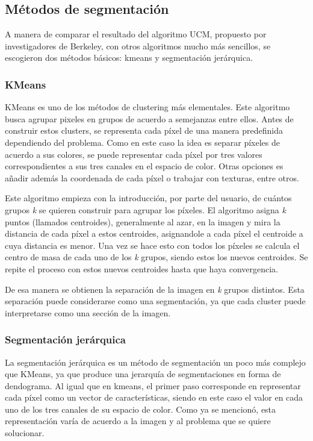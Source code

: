 \documentclass[10pt,twocolumn,letterpaper]{article}
\begin{document}
\subsection{Métodos de segmentación  \cite{Szeliski}}

A manera de comparar el resultado del algoritmo UCM, propuesto por investigadores de Berkeley, con otros algoritmos mucho más sencillos, se escogieron dos métodos básicos: kmeans y segmentación jerárquica.

\subsubsection{KMeans}
KMeans es uno de los métodos de clustering más elementales. Este algoritmo busca agrupar pixeles en grupos de acuerdo a semejanzas entre ellos. Antes de construir estos clusters, se representa cada píxel de una manera predefinida dependiendo del problema. Como en este caso la idea es separar píxeles de acuerdo a sus colores, se puede representar cada píxel por tres valores correspondientes a sus tres canales en el espacio de color. Otras opciones es añadir además la coordenada de cada píxel o trabajar con texturas, entre otros. 

Este algoritmo empieza con la introducción, por parte del usuario, de cuántos grupos \textit{k} se quieren construir para agrupar los píxeles. El algoritmo asigna \textit{k} puntos (llamados centroides), generalmente al azar, en la imagen y mira la distancia de cada píxel a estos centroides, asignandole a cada píxel el centroide a cuya distancia es menor. Una vez se hace esto con todos los píxeles se calcula el centro de masa de cada uno de los \textit{k} grupos, siendo estos los nuevos centroides. Se repite el proceso con estos nuevos centroides hasta que haya convergencia. 

De esa manera se obtienen la separación de la imagen en \textit{k} grupos distintos. Esta separación puede considerarse como una segmentación, ya que cada cluster puede interpretarse como una sección de la imagen.

\subsubsection{Segmentación jerárquica}
La segmentación jerárquica es un método de segmentación un poco más complejo que KMeans, ya que produce una jerarquía de segmentaciones en forma de dendograma. Al igual que en kmeans, el primer paso corresponde en representar cada píxel como un vector de características, siendo en este caso el valor en cada uno de los tres canales de su espacio de color. Como ya se mencionó, esta representación varía de acuerdo a la imagen y al problema que se quiere solucionar.
\end{document}
